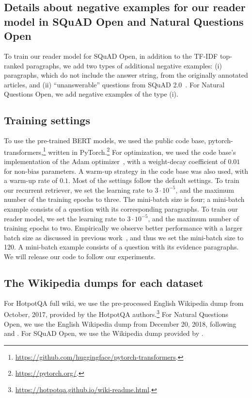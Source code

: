\subsection{Details about negative examples for our reader model in SQuAD Open and Natural Questions Open}

To train our reader model for SQuAD Open, in addition to the TF-IDF top-ranked paragraphs, we add two types of additional negative examples: (i) paragraphs, which do not include the answer string, from the originally annotated articles, and (ii) ``unanswerable'' questions from SQuAD 2.0~\citep{rajpurkar-etal-2018-know}. 
For Natural Questions Open, we add negative examples of the type (i). 

\subsection{Training settings}
To use the pre-trained BERT models, we used the public code base, pytorch-transformers,\footnote{\url{https://github.com/huggingface/pytorch-transformers}.} written in PyTorch.\footnote{\url{https://pytorch.org/}.}
For optimization, we used the code base's implementation of the Adam optimizer~\citep{adam}, with a weight-decay coefficient of $0.01$ for non-bias parameters.
A warm-up strategy in the code base was also used, with a warm-up rate of $0.1$.
Most of the settings follow the default settings.
To train our recurrent retriever, we set the learning rate to $3\cdot 10^{-5}$, and the maximum number of the training epochs to three.
The mini-batch size is four; a mini-batch example consists of a question with its corresponding paragraphs.
To train our reader model, we set the learning rate to $3\cdot 10^{-5}$, and the maximum number of training epochs to two.
Empirically we observe better performance with a larger batch size as discussed in previous work~\citep{liu2019roberta,ott-etal-2018-scaling}, and thus we set the mini-batch size to 120.
A mini-batch example consists of a question with its evidence paragraphs.
We will release our code to follow our experiments.

\subsection{The Wikipedia dumps for each dataset}
\label{subsec:appendix_wikipedia_dumps}

For HotpotQA full wiki, we use the pre-processed English Wikipedia dump from October, 2017, provided by the HotpotQA authors.\footnote{\url{https://hotpotqa.github.io/wiki-readme.html}.}
For Natural Questions Open, we use the English Wikipedia dump from December 20, 2018, following \citet{lee-chang-toutanova:2019:ACL2019} and \citet{min2019discrete}.
For SQuAD Open, we use the Wikipedia dump provided by \cite{chen2017reading}.

